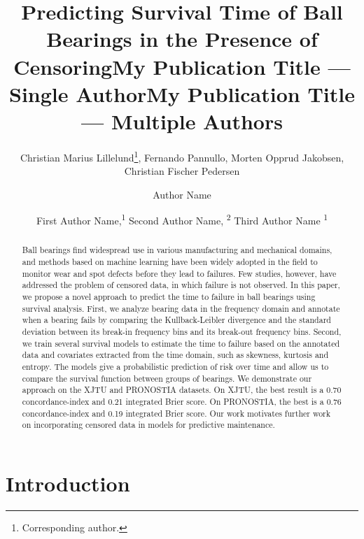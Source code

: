 \documentclass[letterpaper]{article} %
\title{Predicting Survival Time of Ball Bearings in the Presence of Censoring}
\author {
    Christian Marius Lillelund\thanks{Corresponding author.},
    Fernando Pannullo,
    Morten Opprud Jakobsen,\\
    Christian Fischer Pedersen
}
\title{My Publication Title --- Single Author}
\author {
    Author Name
}
\title{My Publication Title --- Multiple Authors}
\author {
    First Author Name,\textsuperscript{\rm 1}
    Second Author Name, \textsuperscript{\rm 2}
    Third Author Name \textsuperscript{\rm 1}
}
\begin{document}
\maketitle

\begin{abstract}
Ball bearings find widespread use in various manufacturing and mechanical domains, and methods based on machine learning have been widely adopted in the field to monitor wear and spot defects before they lead to failures. Few studies, however, have addressed the problem of censored data, in which failure is not observed. In this paper, we propose a novel approach to predict the time to failure in ball bearings using survival analysis. First, we analyze bearing data in the frequency domain and annotate when a bearing fails by comparing the Kullback-Leibler divergence and the standard deviation between its break-in frequency bins and its break-out frequency bins. Second, we train several survival models to estimate the time to failure based on the annotated data and covariates extracted from the time domain, such as skewness, kurtosis and entropy. The models give a probabilistic prediction of risk over time and allow us to compare the survival function between groups of bearings. We demonstrate our approach on the XJTU and PRONOSTIA datasets. On XJTU, the best result is a 0.70 concordance-index and 0.21 integrated Brier score. On PRONOSTIA, the best is a 0.76 concordance-index and 0.19 integrated Brier score. Our work motivates further work on incorporating censored data in models for predictive maintenance.
\end{abstract}

\section{Introduction}
\end{document}
